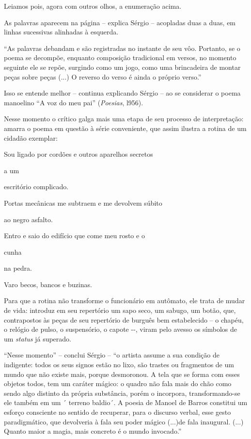Leiamos pois, agora com outros olhos, a enumeração acima.

As palavras aparecem na página -- explica Sérgio -- acopladas duas a
duas, em linhas sucessivas alinhadas à esquerda.

``As palavras debandam e são registradas no instante de seu vôo.
Portanto, se o poema se decompõe, enquanto composição tradicional em
versos, no momento seguinte ele se repõe, surgindo como um jogo, como
uma brincadeira de montar peças sobre peças (...) O reverso do verso é
ainda o próprio verso.''

Isso se entende melhor -- continua explicando Sérgio -- ao se considerar
o poema manoelino ``A voz do meu pai'' (\emph{Poesias}, l956).

Nesse momento o crítico galga mais uma etapa de seu processo de
interpretação: amarra o poema em questão à série conveniente, que assim
ilustra a rotina de um cidadão exemplar:

Sou ligado por cordões e outros aparelhos secretos

a um

escritório complicado.

Portas mecânicas me subtraem e me devolvem súbito

ao negro asfalto.

Entro e saio do edifício que come meu rosto e o

cunha

na pedra.

Varo becos, bancos e buzinas.

Para que a rotina não transforme o funcionário em autômato, ele trata de
mudar de vida: introduz em seu repertório um sapo seco, um sabugo, um
botão, que, contrapostos às peças de seu repertório de burguês bem
estabelecido -- o chapéu, o relógio de pulso, o suspensório, o capote
-\/-, viram pelo avesso os símbolos de um \emph{status} já superado.

``Nesse momento'' -- conclui Sérgio -- ``o artista assume a sua condição
de indigente: todos os seus signos estão no lixo, são trastes ou
fragmentos de um mundo que não existe mais, porque desmoronou. A tela
que se forma com esses objetos todos, tem um caráter mágico: o quadro
não fala mais do chão como sendo algo distinto da própria substância,
porém o incorpora, transformando-se ele também em um ´ terreno baldio´.
A poesia de Manoel de Barros constitui um esforço consciente no sentido
de recuperar, para o discurso verbal, esse gesto paradigmático, que
devolveria à fala seu poder mágico (...)de fala inaugural. (...) Quanto
maior a magia, mais concreto é o mundo invocado.''

